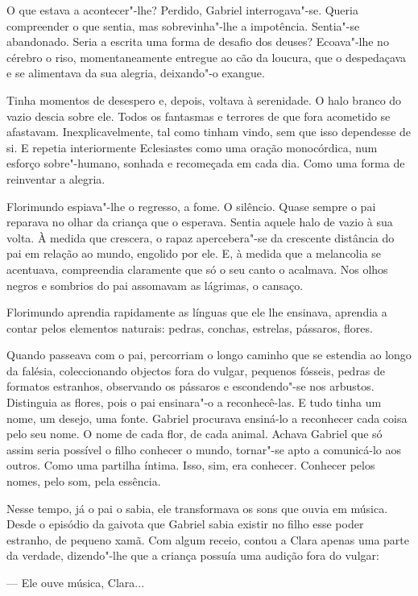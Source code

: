 O que estava a acontecer"-lhe? Perdido, Gabriel interrogava"-se. Queria
compreender o que sentia, mas sobrevinha"-lhe a impotência. Sentia"-se
abandonado. Seria a escrita uma forma de desafio dos deuses? Ecoava"-lhe
no cérebro o riso, momentaneamente entregue ao cão da loucura, que o
despedaçava e se alimentava da sua alegria, deixando"-o exangue.

Tinha momentos de desespero e, depois, voltava à serenidade. O halo
branco do vazio descia sobre ele. Todos os fantasmas e terrores de que
fora acometido se afastavam. Inexplicavelmente, tal como tinham vindo,
sem que isso dependesse de si. E repetia interiormente Eclesiastes como
uma oração monocórdica, num esforço sobre"-humano, sonhada e recomeçada
em cada dia. Como uma forma de reinventar a alegria.

Florimundo espiava"-lhe o regresso, a fome. O silêncio. Quase sempre o
pai reparava no olhar da criança que o esperava. Sentia aquele halo de
vazio à sua volta. À medida que crescera, o rapaz apercebera"-se da
crescente distância do pai em relação ao mundo, engolido por ele. E, à
medida que a melancolia se acentuava, compreendia claramente que só o
seu canto o acalmava. Nos olhos negros e sombrios do pai assomavam as
lágrimas, o cansaço.

Florimundo aprendia rapidamente as línguas que ele lhe ensinava,
aprendia a contar pelos elementos naturais: pedras, conchas, estrelas,
pássaros, flores.

Quando passeava com o pai, percorriam o longo caminho que se estendia ao
longo da falésia, coleccionando objectos fora do vulgar, pequenos
fósseis, pedras de formatos estranhos, observando os pássaros e
escondendo"-se nos arbustos. Distinguia as flores, pois o pai ensinara"-o
a reconhecê-las. E tudo tinha um nome, um desejo, uma fonte. Gabriel
procurava ensiná-lo a reconhecer cada coisa pelo seu nome. O nome de
cada flor, de cada animal. Achava Gabriel que só assim seria possível o
filho conhecer o mundo, tornar"-se apto a comunicá-lo aos outros. Como
uma partilha íntima. Isso, sim, era conhecer. Conhecer pelos nomes, pelo
som, pela essência.

Nesse tempo, já o pai o sabia, ele transformava os sons que ouvia em
música. Desde o episódio da gaivota que Gabriel sabia existir no filho
esse poder estranho, de pequeno xamã. Com algum receio, contou a Clara
apenas uma parte da verdade, dizendo"-lhe que a criança possuía uma
audição fora do vulgar:

--- Ele ouve música, Clara...

